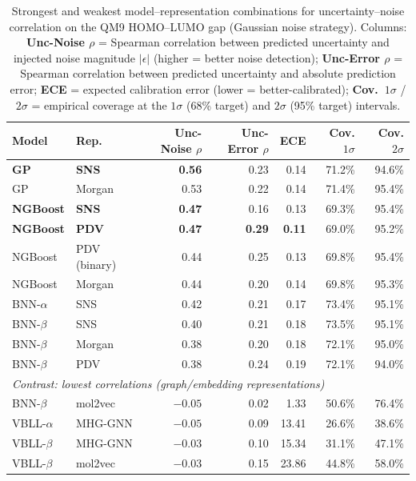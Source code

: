 \documentclass[pdflatex,sn-basic]{sn-jnl}%
\theoremstyle{thmstyleone}%
\theoremstyle{thmstyletwo}%
\theoremstyle{thmstylethree}%
\begin{document}
\begin{table}[htbp]
\centering
\caption{Strongest and weakest model--representation combinations for uncertainty--noise correlation on the QM9 HOMO--LUMO gap (Gaussian noise strategy). Columns: \textbf{Unc-Noise $\rho$} = Spearman correlation between predicted uncertainty and injected noise magnitude $|\epsilon|$ (higher = better noise detection); \textbf{Unc-Error $\rho$} = Spearman correlation between predicted uncertainty and absolute prediction error; \textbf{ECE} = expected calibration error (lower = better-calibrated); \textbf{Cov.\ $1\sigma$} / \textbf{$2\sigma$} = empirical coverage at the $1\sigma$ (68\% target) and $2\sigma$ (95\% target) intervals.}
\label{tab:top_unc_noise}
\small
\begin{tabular}{llrrrrr}
\toprule
\textbf{Model} & \textbf{Rep.} & \textbf{Unc-Noise $\rho$} & \textbf{Unc-Error $\rho$} & \textbf{ECE} & \textbf{Cov. $1\sigma$} & \textbf{Cov. $2\sigma$} \\
\midrule
\textbf{GP}    & \textbf{SNS}    & \textbf{0.56} & 0.23 & 0.14 & 71.2\% & 94.6\% \\
GP             & Morgan          & 0.53 & 0.22 & 0.14 & 71.4\% & 95.4\% \\
\textbf{NGBoost} & \textbf{SNS}  & \textbf{0.47} & 0.16 & 0.13 & 69.3\% & 95.4\% \\
\textbf{NGBoost} & \textbf{PDV}  & \textbf{0.47} & \textbf{0.29} & \textbf{0.11} & 69.0\% & 95.2\% \\
NGBoost        & PDV (binary)    & 0.44 & 0.25 & 0.13 & 69.8\% & 95.4\% \\
NGBoost        & Morgan          & 0.44 & 0.20 & 0.14 & 69.8\% & 95.3\% \\
BNN-$\alpha$   & SNS             & 0.42 & 0.21 & 0.17 & 73.4\% & 95.1\% \\
BNN-$\beta$    & SNS             & 0.40 & 0.21 & 0.18 & 73.5\% & 95.1\% \\
BNN-$\beta$    & Morgan          & 0.38 & 0.20 & 0.18 & 72.1\% & 95.0\% \\
BNN-$\beta$    & PDV             & 0.38 & 0.24 & 0.19 & 72.1\% & 94.0\% \\
\midrule
\multicolumn{7}{l}{\textit{Contrast: lowest correlations (graph/embedding representations)}} \\
\midrule
BNN-$\beta$ & mol2vec & $-0.05$ & 0.02 & 1.33 & 50.6\% & 76.4\% \\
VBLL-$\alpha$ & MHG-GNN & $-0.05$ & 0.09 & 13.41 & 26.6\% & 38.6\% \\
VBLL-$\beta$ & MHG-GNN & $-0.03$ & 0.10 & 15.34 & 31.1\% & 47.1\% \\
VBLL-$\beta$ & mol2vec & $-0.03$ & 0.15 & 23.86 & 44.8\% & 58.0\% \\
\bottomrule
\end{tabular}
\end{table}
\end{document}
